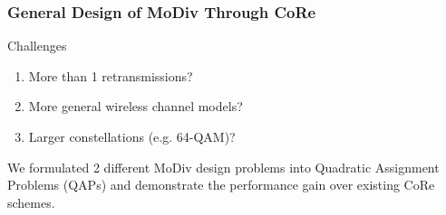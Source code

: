 \documentclass{beamer}
\begin{document}
\begin{frame}
  \frametitle{General Design of MoDiv Through CoRe}
  \begin{block}{Challenges}
    \begin{enumerate}
      \item More than 1 retransmissions?
      \item More general wireless channel models?
      \item Larger constellations (e.g. 64-QAM)?
    \end{enumerate}
  \end{block}
  
  We formulated 2 different MoDiv design problems into \alert{Quadratic
  Assignment Problems (QAPs)} and demonstrate the performance gain over existing
  CoRe schemes.
\end{frame}
\end{document}

